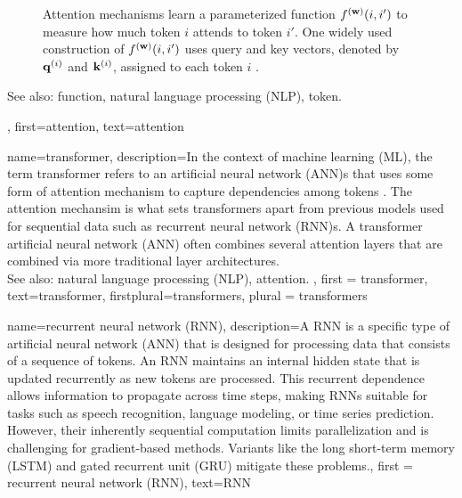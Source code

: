 {{{\begin{figure}[H]
			\caption{Attention mechanisms learn a parameterized function $f^{({\bf w})}(i,i')$ to measure 
				how much token $i$ attends to token $i'$. One widely used construction of $f^{({\bf w})}(i,i')$ 
				uses query and key vectors, denoted by ${\bf q}^{(i)}$ and ${\bf k}^{(i)}$, assigned to each 
				token $i$ \cite{vaswani2017attention}. \label{fig_attention_dict}}
		\end{figure}
		See also: function, natural language processing (NLP), token.},
	first={attention},
	text={attention}
}

{name={transformer},
 description={In the context of machine learning (ML), the term transformer 
 	refers to an artificial neural network (ANN)s that uses some form of attention mechanism 
 	to capture dependencies among tokens \cite{vaswani2017attention}. 
 	The attention mechansim is what sets transformers apart from 
	previous models used for sequential data such as recurrent neural network (RNN)s. 
	A transformer artificial neural network (ANN) often combines several attention layers 
	that are combined via more traditional layer architectures. \\ 
	See also: natural language processing (NLP), attention.
  }, 
 first = {transformer}, 
 text={transformer},
 firstplural={transformers}, 
 plural = {transformers}
}

{name={recurrent neural network (RNN)},
 description={A  RNN 
  is a specific type of artificial neural network (ANN) that is designed for processing 
    data that consists of a sequence of tokens. 
	An RNN maintains an internal hidden state that is updated recurrently 
	as new tokens are processed. This recurrent dependence allows 
	information to propagate across time steps, making RNNs suitable for 
	tasks such as speech recognition, language modeling, or time series prediction. 
    However, their inherently sequential computation limits parallelization and 
	is challenging for gradient-based methods. Variants like the long short-term memory (LSTM) 
	and gated recurrent unit (GRU) mitigate these problems.}, 
 first = {recurrent neural network (RNN)},
 text={RNN}
}

}
